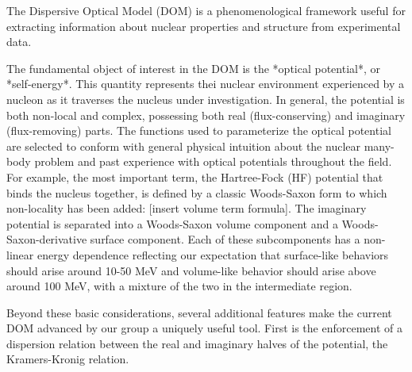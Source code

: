 The Dispersive Optical Model (DOM) is a phenomenological framework useful for 
extracting information about nuclear properties and structure from experimental
data.

The fundamental object of interest in the DOM is the *optical potential*, or
*self-energy*. This quantity represents thei nuclear environment experienced
by a nucleon as it traverses the nucleus under investigation. In general, the
potential is both non-local and complex, possessing both real (flux-conserving)
and imaginary (flux-removing) parts. The functions used to parameterize the optical potential
are selected to conform with general physical intuition about the nuclear
many-body problem and past experience with optical potentials throughout the
field. For example, the most important term, the Hartree-Fock (HF) potential
that binds the nucleus together, is defined by a classic Woods-Saxon form to
which non-locality has been added: [insert volume term formula]. The imaginary
potential is separated into a Woods-Saxon volume component and a
Woods-Saxon-derivative surface component. Each of these subcomponents has
a non-linear energy dependence reflecting our expectation that surface-like
behaviors should arise around 10-50 MeV and volume-like behavior should arise
above around 100 MeV, with a mixture of the two in the intermediate region.

Beyond these basic considerations, several additional features make the current
DOM advanced by our group a uniquely useful tool. First is the enforcement of a
dispersion relation between the real and imaginary halves of the potential,
the Kramers-Kronig relation. 



